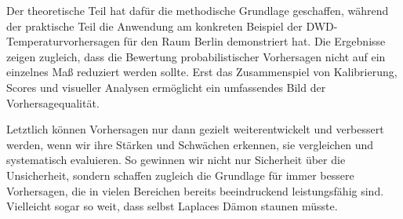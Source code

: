 Der theoretische Teil hat dafür die methodische Grundlage geschaffen, während der praktische Teil die Anwendung am konkreten Beispiel der DWD-Temperaturvorhersagen für den Raum Berlin demonstriert hat. Die Ergebnisse zeigen zugleich, dass die Bewertung probabilistischer Vorhersagen nicht auf ein einzelnes Maß reduziert werden sollte. Erst das Zusammenspiel von Kalibrierung, Scores und visueller Analysen ermöglicht ein umfassendes Bild der Vorhersagequalität.

Letztlich können Vorhersagen nur dann gezielt weiterentwickelt und verbessert werden, wenn wir ihre Stärken und Schwächen erkennen, sie vergleichen und systematisch evaluieren. So gewinnen wir nicht nur Sicherheit über die Unsicherheit, sondern schaffen zugleich die Grundlage für immer bessere Vorhersagen, die in vielen Bereichen bereits beeindruckend leistungsfähig sind. Vielleicht sogar so weit, dass selbst Laplaces Dämon staunen müsste.

\FloatBarrier